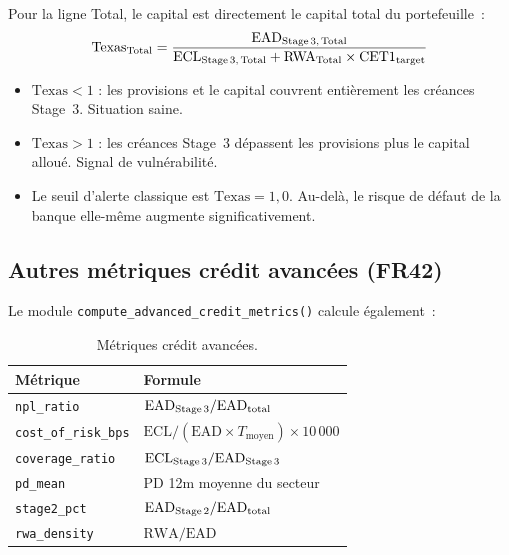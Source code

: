 \documentclass[12pt,a4paper]{article}
\begin{document}
Pour la ligne Total, le capital est directement le capital total du portefeuille~:
\begin{equation}
    \text{Texas}_{\text{Total}} = \frac{\text{EAD}_{\text{Stage\,3,\,Total}}}{\text{ECL}_{\text{Stage\,3,\,Total}} + \text{RWA}_{\text{Total}} \times \text{CET1}_{\text{target}}}
    \label{eq:texas_total}
\end{equation}

\begin{interpretbox}
\begin{itemize}[nosep]
    \item $\text{Texas} < 1$ : les provisions et le capital couvrent enti\`erement les cr\'eances Stage~3. Situation saine.
    \item $\text{Texas} > 1$ : les cr\'eances Stage~3 d\'epassent les provisions plus le capital allou\'e. Signal de vuln\'erabilit\'e.
    \item Le seuil d'alerte classique est $\text{Texas} = 1{,}0$. Au-del\`a, le risque de d\'efaut de la banque elle-m\^eme augmente significativement.
\end{itemize}
\end{interpretbox}

\subsection{Autres m\'etriques cr\'edit avanc\'ees (FR42)}

Le module \texttt{compute\_advanced\_credit\_metrics()} calcule \'egalement~:

\begin{table}[h]
\centering
\begin{tabular}{lp{9cm}}
\toprule
\textbf{M\'etrique} & \textbf{Formule} \\
\midrule
\texttt{npl\_ratio} & $\text{EAD}_{\text{Stage\,3}} / \text{EAD}_{\text{total}}$ \\
\texttt{cost\_of\_risk\_bps} & $\text{ECL} / (\text{EAD} \times T_{\text{moyen}}) \times 10\,000$ \\
\texttt{coverage\_ratio} & $\text{ECL}_{\text{Stage\,3}} / \text{EAD}_{\text{Stage\,3}}$ \\
\texttt{pd\_mean} & PD 12m moyenne du secteur \\
\texttt{stage2\_pct} & $\text{EAD}_{\text{Stage\,2}} / \text{EAD}_{\text{total}}$ \\
\texttt{rwa\_density} & $\text{RWA} / \text{EAD}$ \\
\bottomrule
\end{tabular}
\caption{M\'etriques cr\'edit avanc\'ees.}
\label{tab:advanced_metrics}
\end{table}
\end{document}

